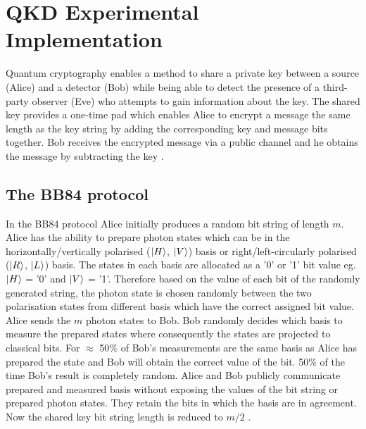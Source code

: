 \section{\label{sec:level1}QKD Experimental Implementation}
Quantum cryptography enables a method to share a private key between a source (Alice) and a detector (Bob) while being able to detect the presence of a third-party observer (Eve) who attempts to gain information about the key. The shared key provides a one-time pad which enables Alice to encrypt a message the same length as the key string by adding the corresponding key and message bits together. Bob receives the encrypted message via a public channel and he obtains the message by subtracting the key \citep{Nielsen2010QuantumInformation}.


\subsection{The BB84 protocol}
In the BB84 protocol Alice initially produces a random bit string of length $m$. Alice has the ability to prepare photon states which can be in the horizontally/vertically polarised ($\lvert H\rangle$, $\lvert V\rangle$) basis or right/left-circularly polarised ($\lvert R\rangle$, $\lvert L\rangle$) basis. The states in each basis are allocated as a '0' or '1' bit value eg. $\lvert H\rangle$ = '0' and $\lvert V\rangle$ = '1'. Therefore based on the value of each bit of the randomly generated string, the photon state is chosen randomly between the two polarisation states from different basis which have the correct assigned bit value. Alice sends the $m$ photon states to Bob. Bob randomly decides which basis to measure the prepared states where consequently the states are projected to classical bits. For $\approx$ 50$\%$ of Bob's measurements are the same basis as Alice has prepared the state  and Bob will obtain the correct value of the bit. 50$\%$ of the time Bob's result is completely random. Alice and Bob publicly communicate prepared and measured basis without exposing the values of the bit string or prepared photon states. They retain the bits in which the basis are in agreement. Now the shared key bit string length is reduced to $m/2$ \citep{Fox2006QuantumIntroduction,Bedington2017ProgressDistribution}. 

